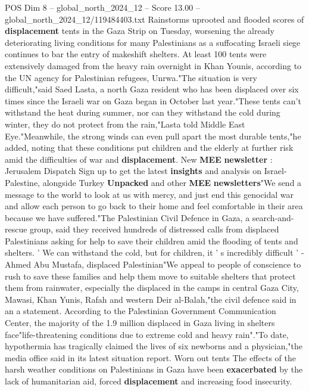 \begin{textsample}{POS Dim 8 – global\_north\_2024\_12 – Score 13.00 – global\_north\_2024\_12/119484403.txt}  \label{ex:f8_pos_097}
Rainstorms uprooted and flooded scores of \textbf{displacement} tents in the Gaza Strip on Tuesday, worsening the already deteriorating living conditions for many Palestinians as a suffocating Israeli siege continues to bar the entry of makeshift shelters.
At least 100 tents were extensively damaged from the heavy rain overnight in Khan Younis, according to the UN agency for Palestinian refugees, Unrwa."The situation is very difficult,"said Saed Lasta, a north Gaza resident who has been displaced over six times since the Israeli war on Gaza began in October last year."These tents can't withstand the heat during summer, nor can they withstand the cold during winter, they do not protect from the rain,"Lasta told Middle East Eye."Meanwhile, the strong winds can even pull apart the most durable tents,"he added, noting that these conditions put children and the elderly at further risk amid the difficulties of war and \textbf{displacement}.
New \textbf{MEE} \textbf{newsletter} : Jerusalem Dispatch Sign up to get the latest \textbf{insights} and analysis on Israel-Palestine, alongside Turkey \textbf{Unpacked} and other \textbf{MEE} \textbf{newsletters}"We send a message to the world to look at us with mercy, and just end this genocidal war and allow each person to go back to their home and feel comfortable in their area because we have suffered."The Palestinian Civil Defence in Gaza, a search-and-rescue group, said they received hundreds of distressed calls from displaced Palestinians asking for help to save their children amid the flooding of tents and shelters. ' We can withstand the cold, but for children, it ' s incredibly difficult ' - Ahmed Abu Mustafa, displaced Palestinian"We appeal to people of conscience to rush to save these families and help them move to suitable shelters that protect them from rainwater, especially the displaced in the camps in central Gaza City, Mawasi, Khan Yunis, Rafah and western Deir al-Balah,"the civil defence said in an a statement.
According to the Palestinian Government Communication Center, the majority of the 1.9 million displaced in Gaza living in shelters face"life-threatening conditions due to extreme cold and heavy rain"."To date, hypothermia has tragically claimed the lives of six newborns and a physician,"the media office said in its latest situation report.
Worn out tents The effects of the harsh weather conditions on Palestinians in Gaza have been \textbf{exacerbated} by the lack of humanitarian aid, forced \textbf{displacement} and increasing food insecurity.

\end{textsample}
